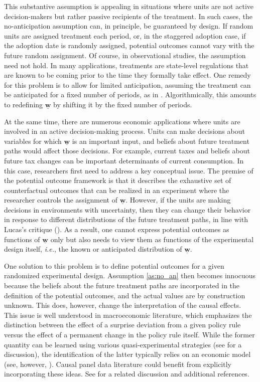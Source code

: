 \documentclass[letterpaper,12pt,leqno]{article}
\newcommand{\ubww}{\underline{\mathbf{w}}}
\begin{document}
This substantive assumption is appealing in situations where units are not active decision-makers but rather passive recipients of the treatment. In such cases, the no-anticipation assumption can, in principle, be guaranteed by design. If random units are assigned treatment each period, or, in the staggered adoption case, if the adoption date is randomly assigned, potential outcomes cannot vary with the future random assignment. Of course, in observational studies, the assumption need not hold. In many applications, treatments are state-level regulations that are known to be coming prior to the time they formally take effect. One remedy for this problem is to allow for limited anticipation, assuming the treatment can be anticipated for a fixed number of periods, as in \citep{callaway2020difference}. Algorithmically, this amounts to redefining $\ubww$ by shifting it by the fixed number of periods.

At the same time, there are numerous economic applications where units are involved in an active decision-making process. Units can make decisions about variables for which $\ubww$ is an important input, and beliefs about future treatment paths would affect those decisions. For example, current taxes and beliefs about future tax changes can be important determinants of current consumption. In this case, researchers first need to address a key conceptual issue. The premise of the potential outcome framework is that it describes the exhaustive set of counterfactual outcomes that can be realized in an experiment where the researcher controls the assignment of $\ubww$. However, if the units are making decisions in environments with uncertainty, then they can change their behavior in response to different distributions of the future treatment paths, in line with Lucas's critique (\citealp{lucas1976econometric}). As a result, one cannot express potential outcomes as functions of $\ubww$ only but also needs to view them as functions of the experimental design itself, {\it i.e.}, the known or anticipated distribution of $\ubww$. 

One solution to this problem is to define potential outcomes for a given randomized experimental design. 
Assumption \ref{as:no_an} then becomes innocuous because the beliefs about the future treatment paths are incorporated in the definition of the potential outcomes, and the actual values are by construction unknown.  This does, however, change the interpretation of the causal effects. This issue is well understood in macroeconomic literature, which emphasizes the distinction between the effect of a surprise deviation
from a given policy rule versus the effect of a permanent change in the policy rule itself. While the former quantity can be learned using various quasi-experimental strategies (see \citep{nakamura2018identification} for a discussion), the identification of the latter typically relies on an economic model (see, however, \citealp{McKay2023}). Causal panel data literature could benefit from explicitly incorporating these ideas. See \citep{abbring2007econometric} for a related discussion and additional references.  
\end{document}
